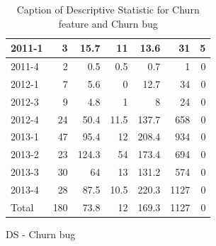 \documentclass[UKenglish]{ifimaster}  %
\begin{document}
\begin{appendices}
\begin{table}[!htbp]
\begin{adjustwidth}{-1.5cm}{}
\begin{subfigure}[b]{0.3\textwidth}
{\begin{tabular}{ | l | r | r | r | r | r | r | }
 2011-1  & 3 & 15.7 & 11 & 13.6 & 31 & 5 \\ \hline
 2011-4  & 2 & 0.5 & 0.5 & 0.7 & 1 & 0\\ \hline
 2012-1  & 7 & 5.6 & 0 &12.7 & 34 & 0\\ \hline
 2012-3  & 9 & 4.8 & 1 & 8 & 24 & 0\\ \hline
 2012-4  & 24 & 50.4 & 11.5 & 137.7 & 658 & 0\\ \hline
 2013-1  & 47 & 95.4 & 12 & 208.4 & 934 & 0\\ \hline
 2013-2  & 23 & 124.3 & 54 & 173.4 & 694 & 0\\ \hline
 2013-3  & 30 & 64 & 13 & 131.2 & 574 & 0\\ \hline
 2013-4  & 28 & 87.5 & 10.5 & 220.3 & 1127 & 0\\ \hline
 Total  & 180 & 73.8 & 12 & 169.3 & 1127 & 0\\ \hline
\end{tabular}
}
\caption{DS - Churn bug}
 \label{DS:CB:6}
\end{subfigure}
\end{adjustwidth}
\caption[Optional caption for list of figures]{Caption of Descriptive Statistic for Churn feature and Churn bug}
\label{DS:6:4}
\end{table}




\end{appendices}
\end{document}
